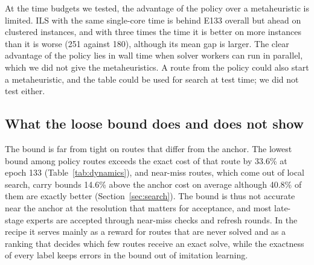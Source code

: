 \documentclass[preprint,12pt,authoryear]{elsarticle}
\begin{document}
\begin{table}[t]
\centering
\caption{Computing cost and plan quality on Real529. Single-core time per instance for the metaheuristics is the stated multiple of the mean single-core time of E133. Gap is to the reference value of Table~\ref{tab:meta}.}
\label{tab:breakeven}
\small
{}
\end{table}

At the time budgets we tested, the advantage of the policy over a metaheuristic is limited. ILS with the same single-core time is behind E133 overall but ahead on clustered instances, and with three times the time it is better on more instances than it is worse (251 against 180), although its mean gap is larger. The clear advantage of the policy lies in wall time when solver workers can run in parallel, which we did not give the metaheuristics. A route from the policy could also start a metaheuristic, and the table could be used for search at test time; we did not test either.

\subsection{What the loose bound does and does not show}
\label{sec:loose}

The bound is far from tight on routes that differ from the anchor. The lowest bound among policy routes exceeds the exact cost of that route by 33.6\% at epoch 133 (Table~\ref{tab:dynamics}), and near-miss routes, which come out of local search, carry bounds 14.6\% above the anchor cost on average although 40.8\% of them are exactly better (Section~\ref{sec:search}). The bound is thus not accurate near the anchor at the resolution that matters for acceptance, and most late-stage experts are accepted through near-miss checks and refresh rounds. In the recipe it serves mainly as a reward for routes that are never solved and as a ranking that decides which few routes receive an exact solve, while the exactness of every label keeps errors in the bound out of imitation learning.
\end{document}
